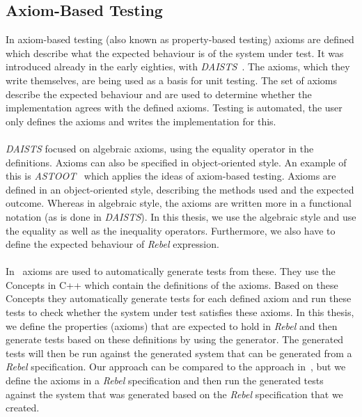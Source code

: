 \subsection{Axiom-Based Testing}
In axiom-based testing (also known as property-based testing) axioms are defined which describe what the expected behaviour is of the system under test. It was introduced already in the early eighties, with \textit{DAISTS}~\cite{gannon1981data}. The axioms, which they write themselves, are being used as a basis for unit testing. The set of axioms describe the expected behaviour and are used to determine whether the implementation agrees with the defined axioms. Testing is automated, the user only defines the axioms and writes the implementation for this.\\
\\
\textit{DAISTS} focused on algebraic axioms, using the equality operator in the definitions. Axioms can also be specified in object-oriented style. An example of this is \textit{ASTOOT}~\cite{doong1994astoot} which applies the ideas of axiom-based testing. Axioms are defined in an object-oriented style, describing the methods used and the expected outcome. Whereas in algebraic style, the axioms are written more in a functional notation (as is done in \textit{DAISTS}). In this thesis, we use the algebraic style and use the equality as well as the inequality operators. Furthermore, we also have to define the expected behaviour of \textit{Rebel} expression.\\
\\
In~\cite{bagge2010axioms} axioms are used to automatically generate tests from these. They use the Concepts in C++ which contain the definitions of the axioms. Based on these Concepts they automatically generate tests for each defined axiom and run these tests to check whether the system under test satisfies these axioms. In this thesis, we define the properties (axioms) that are expected to hold in \textit{Rebel} and then generate tests based on these definitions by using the generator. The generated tests will then be run against the generated system that can be generated from a \textit{Rebel} specification. Our approach can be compared to the approach in~\cite{bagge2010axioms}, but we define the axioms in a \textit{Rebel} specification and then run the generated tests against the system that was generated based on the \textit{Rebel} specification that we created.

